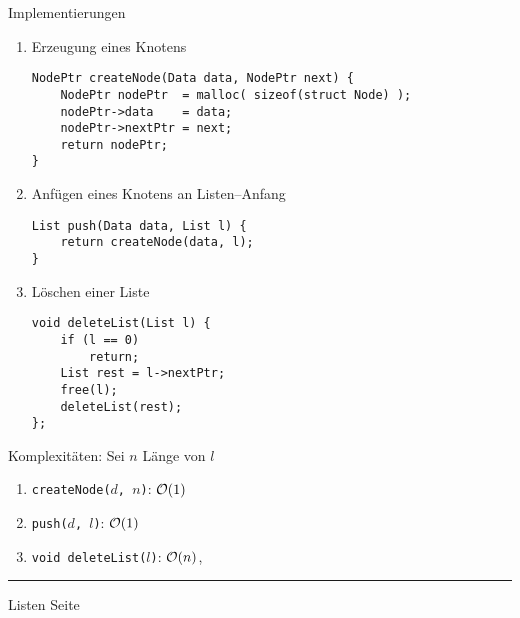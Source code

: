 \begin{slide}{}
\normalsize
\begin{center}
  Implementierungen
\end{center}

\footnotesize

\begin{enumerate}
\item Erzeugung eines Knotens

\begin{verbatim}
NodePtr createNode(Data data, NodePtr next) {
    NodePtr nodePtr  = malloc( sizeof(struct Node) );
    nodePtr->data    = data;
    nodePtr->nextPtr = next;
    return nodePtr;
}
\end{verbatim}

\item Anf\"ugen eines Knotens an Listen--Anfang

\begin{verbatim}
List push(Data data, List l) {
    return createNode(data, l);
}
\end{verbatim}


\item L\"oschen einer Liste

\begin{verbatim}
void deleteList(List l) {
    if (l == 0)
        return;
    List rest = l->nextPtr;
    free(l);
    deleteList(rest);
};
\end{verbatim}
\end{enumerate}

Komplexit\"aten: Sei $n$ L\"ange von $l$
\begin{enumerate}
\item \texttt{createNode($d$, $n$)}: $\mathcal{O}(1)$
\item \texttt{push($d$, $l$)}: $\mathcal{O}(1)$
\item \texttt{void deleteList($l$)}: $\mathcal{O}(n)$,
\end{enumerate}

\vspace*{\fill}
\tiny \addtocounter{mypage}{1}
\rule{17cm}{1mm}
Listen  \hspace*{\fill} Seite 
\end{slide}



